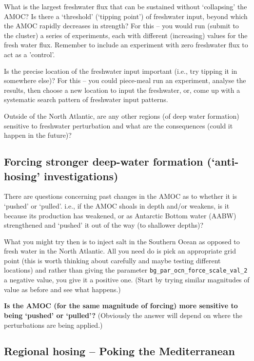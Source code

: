 What is the largest freshwater flux that can be sustained without ‘collapsing’ the AMOC? Is there a ‘threshold’ (‘tipping point’) of freshwater input, beyond which the AMOC rapidly decreases in strength? For this -- you would run (submit to the cluster) a series of experiments, each with different (increasing) values for the fresh water flux. Remember to include an experiment with zero freshwater flux to act as a 'control'.

Is the precise location of the freshwater input important (i.e., try tipping it in somewhere else)? For this -- you could piece-meal run an experiment, analyse the results, then choose a new location to input the freshwater, or, come up with a systematic search pattern of freshwater input patterns.  

Outside of the North Atlantic, are any other  regions (of deep water formation) sensitive to freshwater perturbation and what are the consequences (could it happen in the future)?


\subsection{Forcing stronger deep-water formation (‘anti-hosing’ investigations)}

There are questions concerning past changes in the AMOC as to whether it is ‘pushed’ or ‘pulled’. i.e., if the AMOC shoals in depth and/or weakens, is it because its production has weakened, or as Antarctic Bottom water (AABW) strengthened and ‘pushed’ it out of the way (to shallower depths)?

What you might try then is to inject salt in the Southern Ocean as opposed to fresh water in the North Atlantic. All you need do is pick an appropriate grid point (this is worth thinking about carefully and maybe testing different locations) and rather than giving the parameter \texttt{bg\_par\_ocn\_force\_scale\_val\_2} a negative value, you give it a positive one. (Start by trying similar magnitudes of value as before and see what happens.)

\textbf{Is the AMOC (for the same magnitude of forcing) more sensitive to being ‘pushed’ or ‘pulled’?} (Obviously the answer will  depend on where the perturbations are being applied.)


\subsection{Regional hosing -- Poking the Mediterranean}

